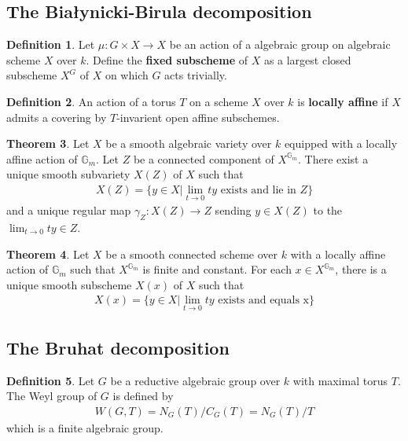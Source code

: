 \documentclass[10pt,UTF8]{article}
\theoremstyle{definition}
\newtheorem{definition}{Definition}[section]
\newtheorem{theorem}[definition]{Theorem}
\begin{document}
\subsection{The Białynicki-Birula decomposition}

\begin{definition}
  Let $\mu:G\times X\to X$ be an action of a algebraic group on algebraic scheme $X$ over $k$.
  Define the \textbf{fixed subscheme} of $X$ as a largest closed subscheme $X^G$ of $X$ on which
  $G$ acts trivially.
\end{definition}



\begin{definition}
  An action of a torus $T$ on a scheme $X$ over $k$ is \textbf{locally affine} if $X$ 
  admits a covering by $T$-invarient open affine subschemes.
\end{definition}



\begin{theorem}
  Let $X$ be a smooth algebraic variety over $k$ equipped with a locally affine action of $\mathbb{G}_m$.
  Let $Z$ be a connected component of $X^{\mathbb{G}_m}$. There exist a unique smooth
    subvariety $X(Z)$ of $X$ such that
    \begin{align*}
      X(Z) = \{y\in X|\lim_{t\to 0}ty\text{ exists and lie in }Z\}
    \end{align*}
    and a unique regular map $\gamma_Z:X(Z) \to Z$ sending $y\in X(Z)$ to the $\lim_{t\to 0}ty\in Z$.
\end{theorem}

\begin{theorem}
  Let $X$ be a smooth connected scheme over $k$ with a locally affine action of $\mathbb{G}_m$ such that
  $X^{\mathbb{G}_m}$ is finite and constant. For each $x\in X^{\mathbb{G}_m}$, there is a unique
  smooth subscheme $X(x)$ of $X$ such that 
  \begin{align*}
    X(x) = \{y\in X|\lim_{t\to 0}ty\text{ exists and equals x}\}
  \end{align*}
\end{theorem}



\subsection{The Bruhat decomposition}



\begin{definition}
  Let $G$ be a reductive algebraic group over $k$ with maximal torus $T$. The Weyl group of $G$ is defined by 
  \begin{align*}
    W(G,T) = {N_G(T)}/{C_G(T)} = {N_G(T)}/{T}
  \end{align*}
  which is a finite algebraic group. 
\end{definition}
\end{document}
